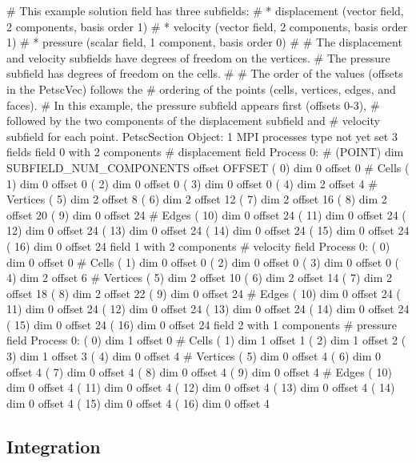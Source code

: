 \begin{shell}
# This example solution field has three subfields:
#   * displacement (vector field, 2 components, basis order 1)
#   * velocity (vector field, 2 components, basis order 1)
#   * pressure (scalar field, 1 component, basis order 0)
#
# The displacement and velocity subfields have degrees of freedom on the vertices.
# The pressure subfield has degrees of freedom on the cells.
#
# The order of the values (offsets in the PetscVec) follows the
# ordering of the points (cells, vertices, edges, and faces).
# In this example, the pressure subfield appears first (offsets 0-3),
# followed by the two components of the displacement subfield and
# velocity subfield for each point.
PetscSection Object: 1 MPI processes
  type not yet set
3 fields
  field 0 with 2 components # displacement field
Process 0:
# (POINT) dim SUBFIELD_NUM_COMPONENTS offset OFFSET
(   0) dim  0 offset   0 # Cells
(   1) dim  0 offset   0
(   2) dim  0 offset   0
(   3) dim  0 offset   0
(   4) dim  2 offset   4 # Vertices
(   5) dim  2 offset   8
(   6) dim  2 offset  12
(   7) dim  2 offset  16
(   8) dim  2 offset  20
(   9) dim  0 offset  24 # Edges
(  10) dim  0 offset  24
(  11) dim  0 offset  24
(  12) dim  0 offset  24
(  13) dim  0 offset  24
(  14) dim  0 offset  24
(  15) dim  0 offset  24
(  16) dim  0 offset  24
field 1 with 2 components # velocity field
Process 0:
(   0) dim  0 offset   0 # Cells
(   1) dim  0 offset   0
(   2) dim  0 offset   0
(   3) dim  0 offset   0
(   4) dim  2 offset   6 # Vertices
(   5) dim  2 offset  10
(   6) dim  2 offset  14
(   7) dim  2 offset  18
(   8) dim  2 offset  22
(   9) dim  0 offset  24 # Edges
(  10) dim  0 offset  24
(  11) dim  0 offset  24
(  12) dim  0 offset  24
(  13) dim  0 offset  24
(  14) dim  0 offset  24
(  15) dim  0 offset  24
(  16) dim  0 offset  24
field 2 with 1 components # pressure field
Process 0:
(   0) dim  1 offset   0 # Cells
(   1) dim  1 offset   1
(   2) dim  1 offset   2
(   3) dim  1 offset   3
(   4) dim  0 offset   4 # Vertices
(   5) dim  0 offset   4
(   6) dim  0 offset   4
(   7) dim  0 offset   4
(   8) dim  0 offset   4
(   9) dim  0 offset   4 # Edges
(  10) dim  0 offset   4
(  11) dim  0 offset   4
(  12) dim  0 offset   4
(  13) dim  0 offset   4
(  14) dim  0 offset   4
(  15) dim  0 offset   4
(  16) dim  0 offset   4


\end{shell}

\subsection{Integration}


